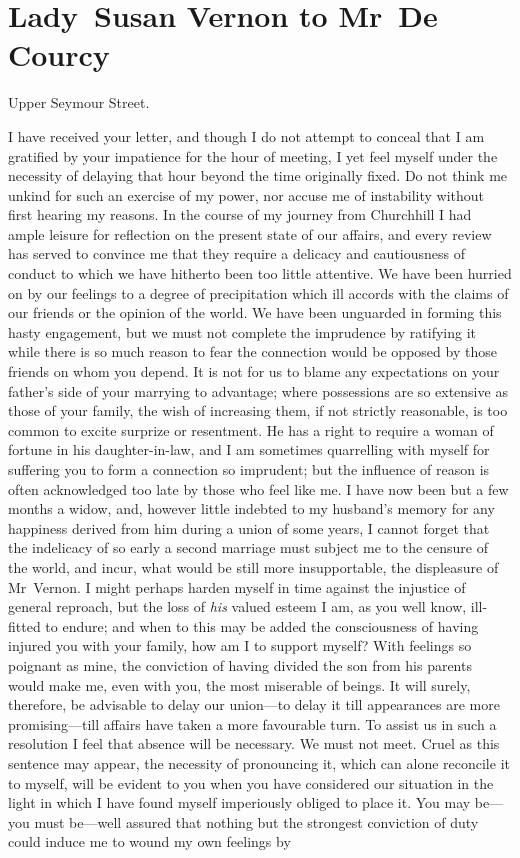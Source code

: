 \chapter{Lady~Susan Vernon to Mr~De Courcy}
  
  \begin{mail}{Upper Seymour Street.}{}

I have received your letter, and though I do not attempt to conceal that I am gratified by your impatience for the hour of meeting, I yet feel myself under the necessity of delaying that hour beyond the time originally fixed. Do not think me unkind for such an exercise of my power, nor accuse me of instability without first hearing my reasons. In the course of my journey from Churchhill I had ample leisure for reflection on the present state of our affairs, and every review has served to convince me that they require a delicacy and cautiousness of conduct to which we have hitherto been too little attentive. We have been hurried on by our feelings to a degree of precipitation which ill accords with the claims of our friends or the opinion of the world. We have been unguarded in forming this hasty engagement, but we must not complete the imprudence by ratifying it while there is so much reason to fear the connection would be opposed by those friends on whom you depend. It is not for us to blame any expectations on your father's side of your marrying to advantage; where possessions are so extensive as those of your family, the wish of increasing them, if not strictly reasonable, is too common to excite surprize or resentment. He has a right to require a woman of fortune in his daughter-in-law, and I am sometimes quarrelling with myself for suffering you to form a connection so imprudent; but the influence of reason is often acknowledged too late by those who feel like me. I have now been but a few months a widow, and, however little indebted to my husband's memory for any happiness derived from him during a union of some years, I cannot forget that the indelicacy of so early a second marriage must subject me to the censure of the world, and incur, what would be still more insupportable, the displeasure of Mr~Vernon. I might perhaps harden myself in time against the injustice of general reproach, but the loss of \textit{his} valued esteem I am, as you well know, ill-fitted to endure; and when to this may be added the consciousness of having injured you with your family, how am I to support myself? With feelings so poignant as mine, the conviction of having divided the son from his parents would make me, even with you, the most miserable of beings. It will surely, therefore, be advisable to delay our union—to delay it till appearances are more promising—till affairs have taken a more favourable turn. To assist us in such a resolution I feel that absence will be necessary. We must not meet. Cruel as this sentence may appear, the necessity of pronouncing it, which can alone reconcile it to myself, will be evident to you when you have considered our situation in the light in which I have found myself imperiously obliged to place it. You may be—you must be—well assured that nothing but the strongest conviction of duty could induce me to wound my own feelings by 
\end{mail}
